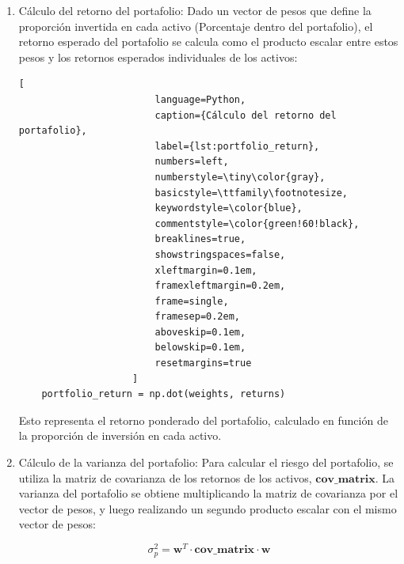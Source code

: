\documentclass[9pt,a4paper,twoside]{rho-class/rho}
\begin{document}
            \begin{enumerate}
                \item Cálculo del retorno del portafolio: Dado un vector de pesos que define la proporción invertida en cada activo (Porcentaje dentro del portafolio), el retorno esperado del portafolio se calcula como el producto escalar entre estos pesos y los retornos esperados individuales de los activos:
                
                    \begin{lstlisting}[
                        language=Python,
                        caption={Cálculo del retorno del portafolio},
                        label={lst:portfolio_return},
                        numbers=left,
                        numberstyle=\tiny\color{gray},
                        basicstyle=\ttfamily\footnotesize,
                        keywordstyle=\color{blue},
                        commentstyle=\color{green!60!black},
                        breaklines=true,
                        showstringspaces=false,
                        xleftmargin=0.1em,
                        framexleftmargin=0.2em,
                        frame=single,
                        framesep=0.2em,
                        aboveskip=0.1em,
                        belowskip=0.1em,
                        resetmargins=true
                    ]
    portfolio_return = np.dot(weights, returns)
                    \end{lstlisting}

                    Esto representa el retorno ponderado del portafolio, calculado en función de la proporción de inversión en cada activo.

                \item Cálculo de la varianza del portafolio: Para calcular el riesgo del portafolio, se utiliza la matriz de covarianza de los retornos de los activos, $\textbf{cov\_matrix}$. La varianza del portafolio se obtiene multiplicando la matriz de covarianza por el vector de pesos, y luego realizando un segundo producto escalar con el mismo vector de pesos:
                
                    \begin{equation}
                        \sigma^2_p = \mathbf{w}^T \cdot \mathbf{cov\_matrix} \cdot \mathbf{w}
                    \end{equation}
                    

\end{enumerate}
\end{document}

